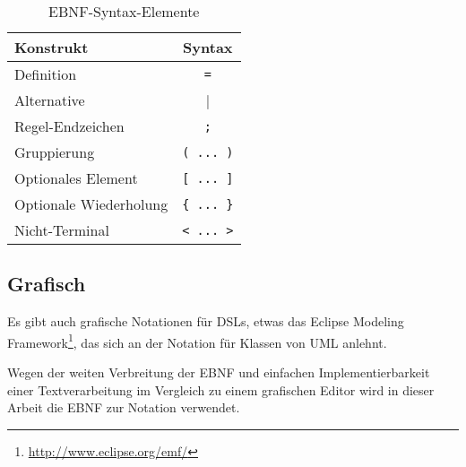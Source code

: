 \documentclass[../InterneDSLs.tex]{subfiles}
\begin{document}
\begin{table}[ht]
\centering
\begin{tabular}{l|c}
\textbf{Konstrukt}     & \textbf{Syntax}\\\hline
Definition             & \verb|=|\\
Alternative            & |\\
Regel-Endzeichen       & \verb|;|\\
Gruppierung            & \verb|( ... )|\\
Optionales Element     & \verb|[ ... ]|\\
Optionale Wiederholung & \verb|{ ... }|\\
Nicht-Terminal         & \verb|< ... >|\\
\end{tabular}
\caption{EBNF-Syntax-Elemente}
\label{TAB:EBNFSyntax}
\end{table}


\subsection{Grafisch}
Es gibt auch grafische Notationen für DSLs, etwas das Eclipse Modeling Framework\footnote{\url{http://www.eclipse.org/emf/}}, das sich an der Notation für Klassen von UML anlehnt.

Wegen der weiten Verbreitung der EBNF und einfachen Implementierbarkeit einer Textverarbeitung im Vergleich zu einem grafischen Editor wird in dieser Arbeit die EBNF zur Notation verwendet.
\end{document}
